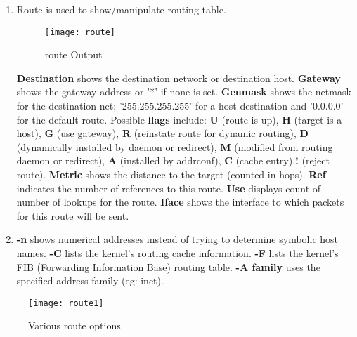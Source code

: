 \documentclass[12pt]{report}
\begin{document}
\begin{enumerate}[label=\textbf{(\alph*)}]
		\item \textbf{} Route  is  used to show/manipulate routing table. \\[1pt]
		\begin{figure}[H]
			\centering
			\texttt{[image: route]}
			\caption{route Output}
		\end{figure}
		\textbf{Destination} shows the destination network or destination host. \textbf{Gateway} shows the gateway address or '*' if none is set. \textbf{Genmask} shows the netmask for the destination net; '255.255.255.255' for a host destination and '0.0.0.0' for the default route. Possible \textbf{flags} include: \textbf{U} (route is up), \textbf{H} (target is a host), \textbf{G} (use gateway), \textbf{R} (reinstate route for dynamic routing), \textbf{D} (dynamically installed by daemon or redirect), \textbf{M} (modified from routing daemon or redirect), \textbf{A} (installed by addrconf), \textbf{C} (cache entry),\textbf{!} (reject route). \textbf{Metric} shows the distance to the target (counted in hops). \textbf{Ref} indicates the number of references to this route. \textbf{Use} displays count of number of lookups for the route. \textbf{Iface} shows the interface to which packets for this route will be sent.	
		\item \textbf{-n} shows numerical addresses instead of trying to determine symbolic host names. \textbf{-C} lists the kernel's routing cache information. \textbf{-F} lists the kernel's FIB (Forwarding Information Base) routing table. \textbf{-A \underline{family}} uses the specified address family (eg: inet). 	
	\end{enumerate}
	\pagebreak
	\vspace*{10px}
	\begin{figure}[H]
		\centering
		\texttt{[image: route1]}
		\caption{Various route options}
	\end{figure}
	
\end{document}
